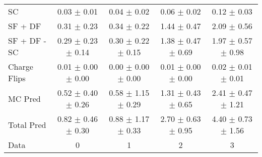 \begin{tabular}{l|cccc}
                                 SC &  0.03 $\pm$  0.01 &  0.04 $\pm$  0.02 &  0.06 $\pm$  0.02 &  0.12 $\pm$  0.03 \\
                            SF + DF &  0.31 $\pm$  0.23 &  0.34 $\pm$  0.22 &  1.44 $\pm$  0.47 &  2.09 $\pm$  0.56 \\
\hline
                       SF + DF - SC &  0.29 $\pm$  0.23 $\pm$  0.14 &  0.30 $\pm$  0.22 $\pm$  0.15 &  1.38 $\pm$  0.47 $\pm$  0.69 &  1.97 $\pm$  0.57 $\pm$  0.98 \\
\hline\hline
                       Charge Flips &  0.01 $\pm$  0.00 $\pm$  0.00 &  0.00 $\pm$  0.00 $\pm$  0.00 &  0.01 $\pm$  0.00 $\pm$  0.00 &  0.02 $\pm$  0.01 $\pm$  0.01 \\
\hline
                            MC Pred &  0.52 $\pm$  0.40 $\pm$  0.26 &  0.58 $\pm$  1.15 $\pm$  0.29 &  1.31 $\pm$  0.43 $\pm$  0.65 &  2.41 $\pm$  0.47 $\pm$  1.21 \\
\hline
                         Total Pred &  0.82 $\pm$  0.46 $\pm$  0.30 &  0.88 $\pm$  1.17 $\pm$  0.33 &  2.70 $\pm$  0.63 $\pm$  0.95 &  4.40 $\pm$  0.73 $\pm$  1.56 \\
\hline\hline
                               Data &     0 &     1 &     2 &     3 \\
\hline\hline
\end{tabular}

